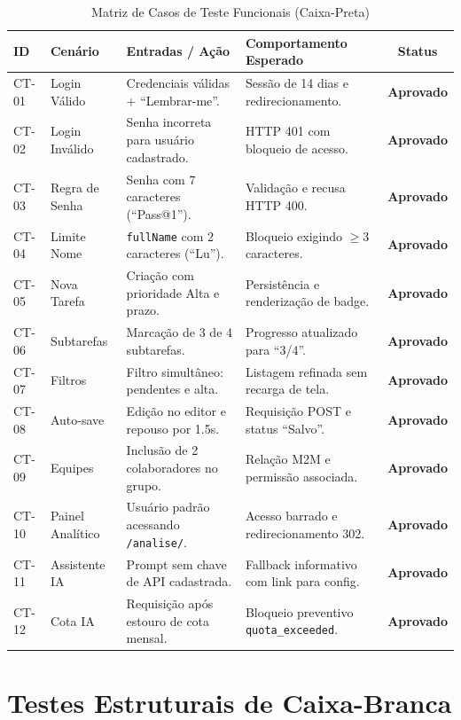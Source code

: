 \documentclass[12pt]{article}
\begin{document}
\begin{table}[htbp]
\centering
\caption{Matriz de Casos de Teste Funcionais (Caixa-Preta)}
\label{tab:caixa_preta}
\small
\begin{tabular}{@{}p{1.2cm}p{3.2cm}p{4.2cm}p{4.0cm}c@{}}
\toprule
\textbf{ID} & \textbf{Cenário} & \textbf{Entradas / Ação} & \textbf{Comportamento Esperado} & \textbf{Status} \\ \midrule
CT-01 & Login Válido & Credenciais válidas + ``Lembrar-me''. & Sessão de 14 dias e redirecionamento. & \textbf{Aprovado} \\
CT-02 & Login Inválido & Senha incorreta para usuário cadastrado. & HTTP 401 com bloqueio de acesso. & \textbf{Aprovado} \\
CT-03 & Regra de Senha & Senha com 7 caracteres (``Pass@1''). & Validação e recusa HTTP 400. & \textbf{Aprovado} \\
CT-04 & Limite Nome & \texttt{fullName} com 2 caracteres (``Lu''). & Bloqueio exigindo $\ge 3$ caracteres. & \textbf{Aprovado} \\
CT-05 & Nova Tarefa & Criação com prioridade Alta e prazo. & Persistência e renderização de badge. & \textbf{Aprovado} \\
CT-06 & Subtarefas & Marcação de 3 de 4 subtarefas. & Progresso atualizado para ``3/4''. & \textbf{Aprovado} \\
CT-07 & Filtros & Filtro simultâneo: pendentes e alta. & Listagem refinada sem recarga de tela. & \textbf{Aprovado} \\
CT-08 & Auto-save & Edição no editor e repouso por 1.5s. & Requisição POST e status ``Salvo''. & \textbf{Aprovado} \\
CT-09 & Equipes & Inclusão de 2 colaboradores no grupo. & Relação M2M e permissão associada. & \textbf{Aprovado} \\
CT-10 & Painel Analítico & Usuário padrão acessando \texttt{/analise/}. & Acesso barrado e redirecionamento 302. & \textbf{Aprovado} \\
CT-11 & Assistente IA & Prompt sem chave de API cadastrada. & Fallback informativo com link para config. & \textbf{Aprovado} \\
CT-12 & Cota IA & Requisição após estouro de cota mensal. & Bloqueio preventivo \texttt{quota\_exceeded}. & \textbf{Aprovado} \\ \bottomrule
\end{tabular}
\end{table}

\section{Testes Estruturais de Caixa-Branca}
\end{document}
